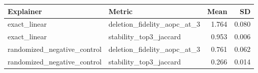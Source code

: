 \begin{tabular}{llrr}
\toprule
Explainer & Metric & Mean & SD \\
\midrule
exact\_linear & deletion\_fidelity\_aopc\_at\_3 & 1.764 & 0.080 \\
exact\_linear & stability\_top3\_jaccard & 0.953 & 0.006 \\
randomized\_negative\_control & deletion\_fidelity\_aopc\_at\_3 & 0.761 & 0.062 \\
randomized\_negative\_control & stability\_top3\_jaccard & 0.266 & 0.014 \\
\bottomrule
\end{tabular}